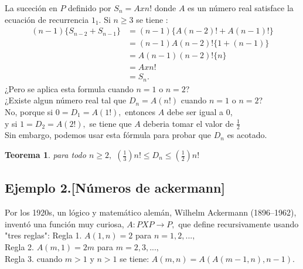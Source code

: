 \documentclass[11pt,a4paper]{article}
\newcommand{\ds}{\displaystyle}
\newtheorem{teo}{Teorema}{}
\begin{document}
La suceción en $P$ definido por $S_{n} = Axn!$ donde $A$ es un número real satisface la ecuación de recurrencia $1_1$. Si $n \geq 3$ se tiene :
\begin{align*}
 (n-1)\{S_{n-2}+S_{n-1}\} &= (n-1)\{A(n-2)! + A(n-1)!\} \\
 						  &= (n-1)A(n-2)!\{1+(n-1)\} \\
 						  &= A(n-1)(n-2)!\{n\}\\
 						  &= A x n!\\
 						  &= S_{n}.
\end{align*}
¿Pero se aplica esta formula cuando $n=1$ o $n=2$?\\
¿Existe algun número real tal que $D_{n} = A(n!)$ cuando $n=1$ o $n=2$?\\
No, porque si $0 = D_{1} =A(1!),$ entonces $A$ debe ser igual a $0$,\\
y si $1 = D_{2} = A(2!),$ se tiene que $A$ deberia tomar el valor de $\frac{1}{2}$\\ \newline
Sin embargo, podemos usar esta fórmula para probar que $D_{n}$ es acotado.
\begin{teo}{}
para todo $n \geq 2,$ $\ds(\frac{1}{3})n! \leq D_{n} \leq (\frac{1}{2})n!$
\end{teo}

\subsection{Ejemplo 2.[Números de ackermann]}
Por los 1920s, un lógico y matemático alemán, Wilhelm Ackermann
(1896–1962), inventó una función muy curiosa, $\ds A:P X P \longrightarrow P,$ que define recursivamente usando "tres reglas":\newline
Regla 1.\hspace*{0.2cm} $\ds A(1,n)=2$ \hspace*{0.3cm} para $n = 1,2,...,$\\
Regla 2.\hspace*{0.2cm} $\ds A(m,1)=2m$ \hspace*{0.3cm} para $m =2,3,...,$\\
Regla 3.\hspace*{0.2cm} cuando $m>1$ y $n>1$ se tiene: $\ds A(m,n) = A(A(m-1,n),n-1).$
\end{document}
